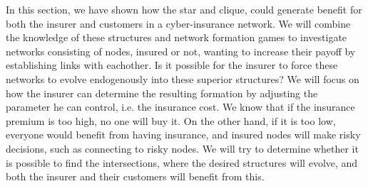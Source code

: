 In this section, we have shown how the star and clique, could generate benefit for both the insurer and customers in a cyber-insurance network. 
We will combine the knowledge of these structures and network formation games to investigate networks consisting of nodes, insured or not, wanting to increase their payoff by establishing links with eachother. Is it possible for the insurer to force these networks to evolve endogenously into these superior structures?
We will focus on how the insurer can determine the resulting formation by adjusting the parameter he can control, i.e. the insurance cost. We know that if the insurance premium is too high, no one will buy it. On the other hand, if it is too low, everyone would benefit from having insurance, and insured nodes will make risky decisions, such as connecting to risky nodes. We will try to determine whether it is possible to find the intersections, where the desired structures will evolve, and both the insurer and their customers will benefit from this.
